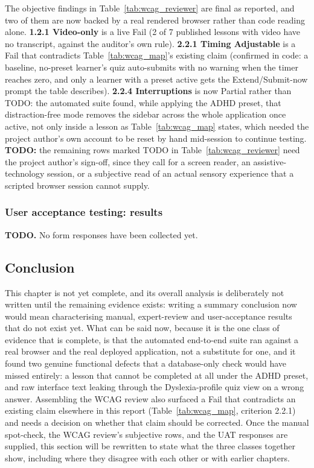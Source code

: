 \documentclass[12pt, oneside]{article} %
\begin{document}
The objective findings in Table~\ref{tab:wcag_reviewer} are final as reported, and two of them are now backed by a real rendered browser rather than code reading alone. \textbf{1.2.1 Video-only} is a live Fail (2 of 7 published lessons with video have no transcript, against the auditor's own rule). \textbf{2.2.1 Timing Adjustable} is a Fail that contradicts Table~\ref{tab:wcag_map}'s existing claim (confirmed in code: a baseline, no-preset learner's quiz auto-submits with no warning when the timer reaches zero, and only a learner with a preset active gets the Extend/Submit-now prompt the table describes). \textbf{2.2.4 Interruptions} is now Partial rather than TODO: the automated suite found, while applying the ADHD preset, that distraction-free mode removes the sidebar across the whole application once active, not only inside a lesson as Table~\ref{tab:wcag_map} states, which needed the project author's own account to be reset by hand mid-session to continue testing. \textbf{TODO:} the remaining rows marked TODO in Table~\ref{tab:wcag_reviewer} need the project author's sign-off, since they call for a screen reader, an assistive-technology session, or a subjective read of an actual sensory experience that a scripted browser session cannot supply.

\subsubsection{User acceptance testing: results}

\textbf{TODO.} No form responses have been collected yet.

\subsection{Conclusion}

This chapter is not yet complete, and its overall analysis is deliberately not written until the remaining evidence exists: writing a summary conclusion now would mean characterising manual, expert-review and user-acceptance results that do not exist yet. What can be said now, because it is the one class of evidence that is complete, is that the automated end-to-end suite ran against a real browser and the real deployed application, not a substitute for one, and it found two genuine functional defects that a database-only check would have missed entirely: a lesson that cannot be completed at all under the ADHD preset, and raw interface text leaking through the Dyslexia-profile quiz view on a wrong answer. Assembling the WCAG review also surfaced a Fail that contradicts an existing claim elsewhere in this report (Table~\ref{tab:wcag_map}, criterion 2.2.1) and needs a decision on whether that claim should be corrected. Once the manual spot-check, the WCAG review's subjective rows, and the UAT responses are supplied, this section will be rewritten to state what the three classes together show, including where they disagree with each other or with earlier chapters.
\end{document}
